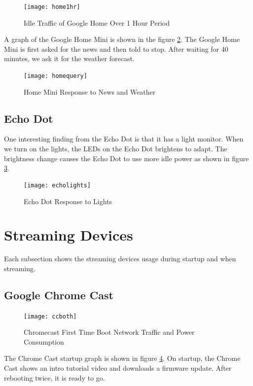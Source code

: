 \begin{figure}[H]
  \centering
    \texttt{[image: home1hr]}
  \caption{Idle Traffic of Google Home Over 1 Hour Period}
  \label{fig:home}
\end{figure}

A graph of the Google Home Mini is shown in the figure \ref{fig:homequery}. The Google Home Mini is first asked for the news and then told to stop. After waiting for 40 minutes, we ask it for the weather forecast.

\begin{figure}[H]
  \centering
    \texttt{[image: homequery]}
  \caption{Home Mini Response to News and Weather}
  \label{fig:homequery}
\end{figure}

\subsection{Echo Dot}

One interesting finding from the Echo Dot is that it has a light monitor. When we turn on the lights, the LEDs on the Echo Dot brightens to adapt. The brightness change causes the Echo Dot to use more idle power as shown in figure \ref{fig:echolights}.

\begin{figure}[H]
  \centering
    \texttt{[image: echolights]}
  \caption{Echo Dot Response to Lights}
  \label{fig:echolights}
\end{figure}

\section{Streaming Devices}
\label{Streaming Devices}

Each subsection shows the streaming devices usage during startup and when streaming.

\subsection{Google Chrome Cast}
\begin{figure}[H]
  \centering
  \texttt{[image: ccboth]}
  \caption{Chromecast First Time Boot Network Traffic and Power Consumption}
  \label{fig:ccboth}
\end{figure}

The Chrome Cast startup graph is shown in figure \ref{fig:ccboth}. On startup, the Chrome Cast shows an intro tutorial video and downloads a firmware update. After rebooting twice, it is ready to go.

